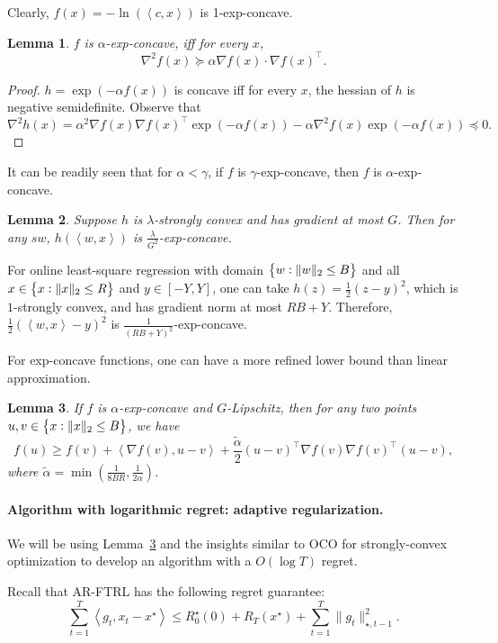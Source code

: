 \documentclass{article}
\newtheorem{lemma}{Lemma}
\newcommand{\inner}[2]{\left\langle #1,#2 \right\rangle}
\begin{document}
Clearly, $f(x) = -\ln(\inner{c}{x})$ is 1-exp-concave.

\begin{lemma}
$f$ is $\alpha$-exp-concave, iff for every $x$,
\[ \nabla^2 f(x) \succeq \alpha \nabla f(x) \cdot \nabla f(x)^\top. \]
\end{lemma}
\begin{proof}
$h = \exp(-\alpha f(x))$ is concave iff for every $x$, the hessian of $h$ is negative
semidefinite.
Observe that
\[ \nabla^2 h(x) = \alpha^2 \nabla f(x) \nabla f(x)^\top \exp(-\alpha f(x)) - \alpha \nabla^2 f(x) \exp(-\alpha f(x)) \preceq 0. \]
\end{proof}

It can be readily seen that for $\alpha < \gamma$, if $f$ is $\gamma$-exp-concave, then $f$ is $\alpha$-exp-concave.

\begin{lemma}
Suppose $h$ is $\lambda$-strongly convex and has gradient at most $G$. Then for any $sw$, $h(\inner{w}{x})$ is $\frac{\lambda}{G^2}$-exp-concave.
\end{lemma}

For online least-square regression with domain $\cbr{w: \| w\|_2 \leq B}$ and all $x \in \cbr{x: \| x \|_2 \leq R}$ and $y \in [-Y, Y]$,
one can take $h(z) = \frac12(z - y)^2$, which is $1$-strongly convex, and has gradient norm at most $RB+Y$. Therefore, $\frac12(\inner{w}{x}-y)^2$ is $\frac{1}{(RB+Y)^2}$-exp-concave.

For exp-concave functions, one can have a more refined lower bound than linear approximation.
\begin{lemma}
If $f$ is $\alpha$-exp-concave and $G$-Lipschitz,
then for any two points $u, v \in \cbr{x: \| x \|_2 \leq B}$, we have
\[ f(u) \geq f(v) + \inner{\nabla f(v)}{u - v} + \frac{\tilde{\alpha}}{2}(u - v)^\top \nabla f(v) \nabla f(v)^\top (u - v), \]
where $\tilde{\alpha} = \min(\frac{1}{8BR}, \frac{1}{2\alpha})$.
\label{lem:quad-approx}
\end{lemma}

\paragraph{Algorithm with logarithmic regret: adaptive regularization.} We will be using Lemma~\ref{lem:quad-approx} and the insights similar to OCO for strongly-convex optimization to develop an algorithm with a $O(\log T)$ regret.

Recall that AR-FTRL has the following regret guarantee:
\[ \sum_{t=1}^T \inner{g_t}{x_t - x^\star} \leq R_0^\star(0) + R_T(x^\star) + \sum_{t=1}^T \| g_t \|_{\star, t-1}^2. \]
\end{document}
